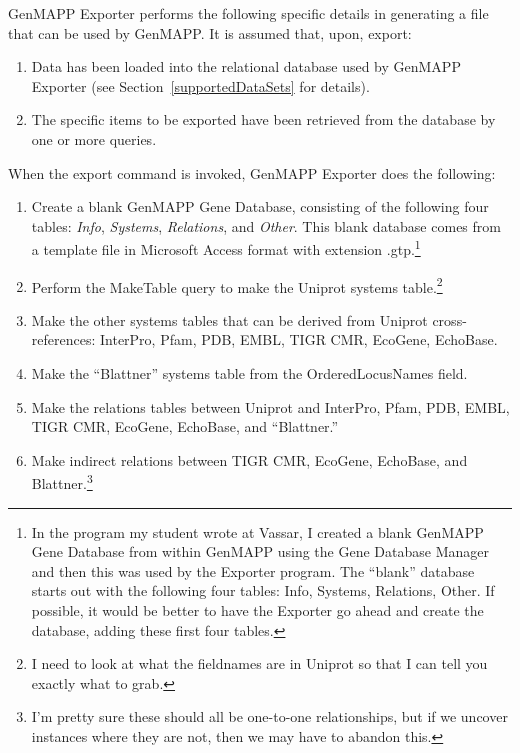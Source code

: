 \documentclass[11pt]{article}
\begin{document}
GenMAPP Exporter performs the following specific details in generating a file that can be used by GenMAPP.  It is assumed that, upon, export:
\begin{enumerate}
\item Data has been loaded into the relational database used by GenMAPP Exporter (see Section~\ref{supportedDataSets} for details).

\item The specific items to be exported have been retrieved from the database by one or more queries.
\end{enumerate}
When the export command is invoked, GenMAPP Exporter does the following:
\begin{enumerate}
\item Create a blank GenMAPP Gene Database, consisting of the following four tables: \emph{Info}, \emph{Systems}, \emph{Relations}, and \emph{Other}.  This blank database comes from a template file in Microsoft Access format with extension .gtp.\footnote{In the program my student wrote at Vassar, I created a blank GenMAPP Gene Database from within GenMAPP using the Gene Database Manager and then this was used by the Exporter program.  The ``blank'' database starts out with the following four tables:  Info, Systems, Relations, Other.  If possible, it would be better to have the Exporter go ahead and create the database, adding these first four tables.}

\item Perform the MakeTable query to make the Uniprot systems table.\footnote{I need to look at what the fieldnames are in Uniprot so that I can tell you exactly what to grab.}

\item Make the other systems tables that can be derived from Uniprot cross-references: InterPro, Pfam, PDB, EMBL, TIGR CMR, EcoGene, EchoBase.

\item Make the ``Blattner'' systems table from the OrderedLocusNames field.

\item Make the relations tables between Uniprot and InterPro, Pfam, PDB, EMBL, TIGR CMR, EcoGene, EchoBase, and ``Blattner.''

\item Make indirect relations between TIGR CMR, EcoGene, EchoBase, and Blattner.\footnote{I'm pretty sure these should all be one-to-one relationships, but if we uncover instances where they are not, then we may have to abandon this.}


\end{enumerate}
\end{document}
